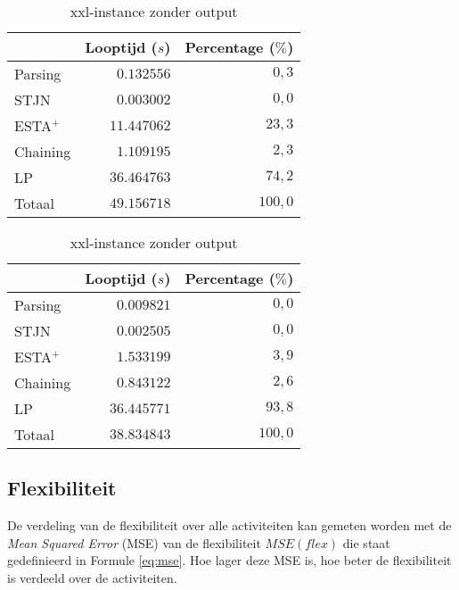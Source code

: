 \begin{table}[H]
\parbox{.45\linewidth}{
    \centering
    \begin{tabular}{| l | r | r |}
        \hline
                    & Looptijd ($s$)  & Percentage ($\%$) \\
        \hline
        Parsing     &  $0.132556$     & $0,3$   \\
        STJN        &  $0.003002$     & $0,0$   \\
        ESTA$^+$    & $11.447062$     & $23,3$  \\
        Chaining    &  $1.109195$     & $2,3$   \\
        LP          & $36.464763$     & $74,2$  \\
        \hline \hline
        Totaal      & $49.156718$     & $100,0$ \\
        \hline
    \end{tabular}
    \caption{xxl-instance met output}
    \label{tbl:xxl+output}
}
\hfill
\parbox{.45\linewidth}{
    \centering
    \begin{tabular}{| l | r | r |}
        \hline
                    & Looptijd ($s$)& Percentage ($\%$) \\
        \hline
        Parsing     &  $0.009821$      &  $0,0$  \\
        STJN        &  $0.002505$      &  $0,0$  \\
        ESTA$^+$    &  $1.533199$      &  $3,9$  \\
        Chaining    &  $0.843122$      &  $2,6$  \\
        LP          & $36.445771$      & $93,8$  \\
        \hline \hline
        Totaal      & $38.834843$      & $100,0$ \\
        \hline
    \end{tabular}
    \caption{xxl-instance zonder output}
    \label{tbl:xxl-output}
}
\end{table}


\subsection{Flexibiliteit}
\label{subsec:flexibiliteit}
De verdeling van de flexibiliteit over alle activiteiten kan gemeten worden met de \emph{Mean Squared Error} (MSE) van de flexibiliteit $MSE(flex)$ die staat gedefinieerd in Formule \ref{eq:mse}. Hoe lager deze MSE is, hoe beter de flexibiliteit is verdeeld over de activiteiten.

